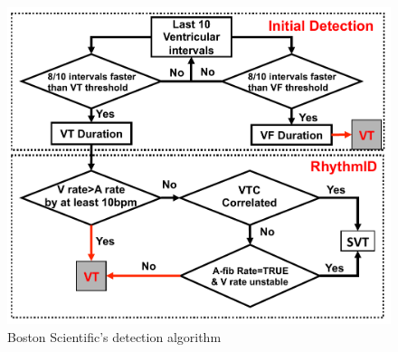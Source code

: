 \begin{figure}[t]
	\centering
	\includegraphics[scale=0.4]{figures/BS_det_nosig}
	\vspace{-10pt}
	\caption{Boston Scientific's detection algorithm}
	\vspace{-10pt}
	\label{fig:bsc detection}
\end{figure}

